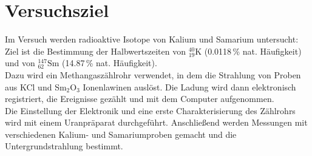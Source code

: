 \section{Versuchsziel}
Im Versuch werden radioaktive Isotope von Kalium und Samarium untersucht:
Ziel ist die Bestimmung der Halbwertszeiten von ${}^{40}_{19}\text{K}$ (0.0118\,\% nat. Häufigkeit)
und von ${}^{147}_{62}\text{Sm}$ (14.87\,\% nat. Häufigkeit).\\
Dazu wird ein Methangaszählrohr verwendet, in dem die Strahlung von Proben aus KCl und Sm$_2$O$_3$ Ionenlawinen
auslöst. Die Ladung wird dann elektronisch registriert, die Ereignisse gezählt und mit dem Computer aufgenommen.\\

Die Einstellung der Elektronik und eine erste Charakterisierung des Zählrohrs wird mit einem Uranpräparat
durchgeführt. Anschließend werden Messungen mit verschiedenen Kalium- und Samariumproben gemacht und
die Untergrundstrahlung bestimmt.